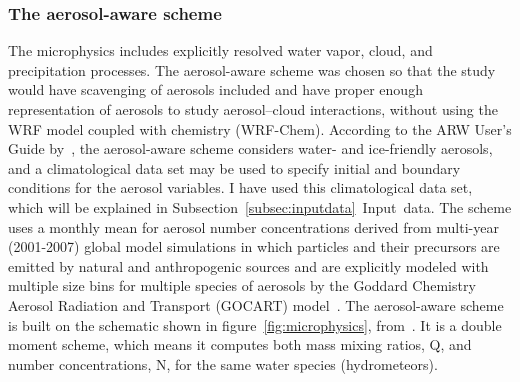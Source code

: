 \subsubsection{The aerosol-aware scheme}
The microphysics includes explicitly resolved water vapor, cloud, and precipitation processes. The aerosol-aware scheme was chosen so that the study would have scavenging of aerosols included and have proper enough representation of aerosols to study aerosol--cloud interactions, without using the WRF model coupled with chemistry (WRF-Chem).
According to the ARW User's Guide by~\citet{Wang2015}, the aerosol-aware scheme considers water- and ice-friendly aerosols, and a climatological data set may be used to specify initial and boundary conditions for the aerosol variables. I have used this climatological data set, which will be explained in Subsection~\ref{subsec:inputdata}~Input~data. The scheme uses a monthly mean for aerosol number concentrations derived from multi-year (2001-2007) global model simulations in which particles and their precursors are emitted by natural and anthropogenic sources and are explicitly modeled with multiple size bins for multiple species of aerosols by the Goddard Chemistry Aerosol Radiation and Transport (GOCART) model~\citep{Thompson2014}.
The aerosol-aware scheme~\citep{Thompson2014} is built on the schematic shown in figure~\ref{fig:microphysics}, from~\citet{Reisner1998}. It is a double moment scheme, which means it computes both mass mixing ratios, Q, and number concentrations, N, for the same water species (hydrometeors). 

